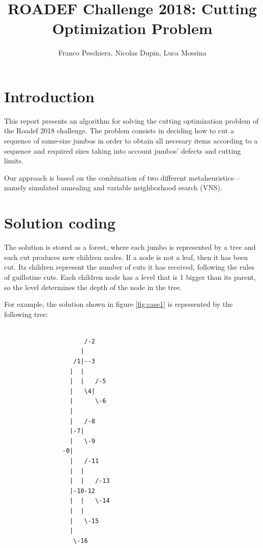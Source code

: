 \documentclass{roadef}
\begin{document}
\title{ROADEF Challenge 2018: Cutting Optimization Problem}


\author{Franco Peschiera, Nicolas Dupin, Luca Mossina}




\maketitle
\thispagestyle{empty}

\section{Introduction}

This report presents an algorithm for solving the cutting optimization problem of the Roadef 2018 challenge.
The problem consists in deciding how to cut a sequence of same-size jumbos in order to obtain all necesary items according to a sequence and required sizes taking into account jumbos' defects and cutting limits.

Our approach is based on the combination of two different metaheuristics—namely simulated annealing
and variable neighborhood search (VNS). 


\section{Solution coding}

        The solution is stored as a forest, where each jumbo is represented by a tree and each cut produces new children nodes. If a node is not a leaf, then it has been cut. Its children represent the number of cuts it has received, following the rules of guillotine cuts.
        Each children node has a level that is 1 bigger than its parent, so the level determines the depth of the node in the tree.

        For example, the solution shown in figure \ref{fig:case1} is represented by the following tree:

        \begin{tiny}
        \begin{verbatim}

                      /-2
                     |
                   /1|--3
                  |  |
                  |  |   /-5
                  |   \4|
                  |      \-6
                  |
                  |   /-8
                  |-7|
                  |   \-9
                -0|
                  |   /-11
                  |  |
                  |  |   /-13
                  |-10-12
                  |  |   \-14
                  |  |
                  |   \-15
                  |
                   \-16

        \end{verbatim}
        \end{tiny}
\end{document}
